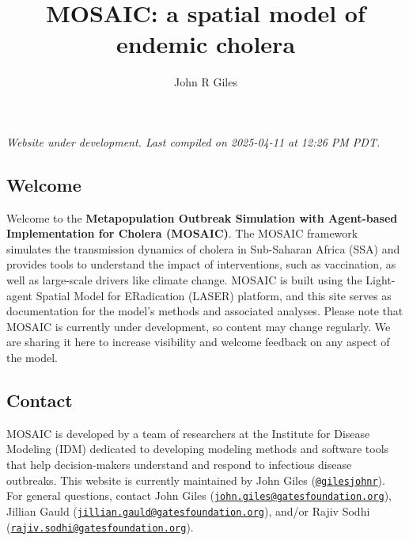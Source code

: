 \documentclass[
]{book}
\title{MOSAIC: a spatial model of endemic cholera}
\author{John R Giles}
\date{}
\begin{document}
\maketitle

{
\setcounter{tocdepth}{1}
\tableofcontents
}
\chapter*{}\label{section}

\hfill\break

{\emph{
Website under development. Last compiled on 2025-04-11 at 12:26 PM PDT.
}}

\section*{Welcome}\label{welcome}

Welcome to the \textbf{Metapopulation Outbreak Simulation with Agent-based Implementation for Cholera (MOSAIC)}. The MOSAIC framework simulates the transmission dynamics of cholera in Sub-Saharan Africa (SSA) and provides tools to understand the impact of interventions, such as vaccination, as well as large-scale drivers like climate change. MOSAIC is built using the Light-agent Spatial Model for ERadication (LASER) platform, and this site serves as documentation for the model's methods and associated analyses. Please note that MOSAIC is currently under development, so content may change regularly. We are sharing it here to increase visibility and welcome feedback on any aspect of the model.

\section*{Contact}\label{contact}

MOSAIC is developed by a team of researchers at the Institute for Disease Modeling (IDM) dedicated to developing modeling methods and software tools that help decision-makers understand and respond to infectious disease outbreaks. This website is currently maintained by John Giles (\href{https://github.com/gilesjohnr}{\texttt{@gilesjohnr}}). For general questions, contact John Giles (\href{mailto:john.giles@gatesfoundation.org}{\nolinkurl{john.giles@gatesfoundation.org}}), Jillian Gauld (\href{mailto:jillian.gauld@gatesfoundation.org}{\nolinkurl{jillian.gauld@gatesfoundation.org}}), and/or Rajiv Sodhi (\href{mailto:rajiv.sodhi@gatesfoundation.org}{\nolinkurl{rajiv.sodhi@gatesfoundation.org}}).
\end{document}
